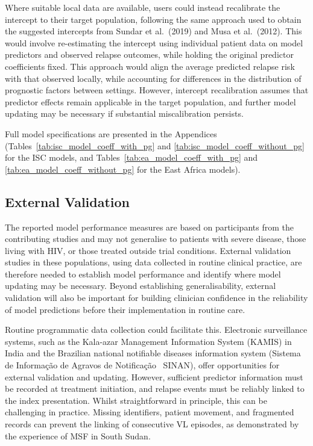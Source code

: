 \begin{mccorrection}
  Where suitable local data are available, users could instead recalibrate the intercept to their target population, following the same approach used to obtain the suggested intercepts from Sundar et al.\ (2019) and Musa et al.\ (2012)\cite{sundar2019,musa2012}. This would involve re-estimating the intercept using individual patient data on model predictors and observed relapse outcomes, while holding the original predictor coefficients fixed\cite{riley2024A}. This approach would align the average predicted relapse risk with that observed locally, while accounting for differences in the distribution of prognostic factors between settings. However, intercept recalibration assumes that predictor effects remain applicable in the target population, and further model updating may be necessary if substantial miscalibration persists.
\end{mccorrection}

Full model specifications are presented in the Appendices (Tables~\ref{tab:isc_model_coeff_with_pg} and \ref{tab:isc_model_coeff_without_pg} for the ISC models, and Tables~\ref{tab:ea_model_coeff_with_pg} and \ref{tab:ea_model_coeff_without_pg} for the East Africa models).

\subsection{External Validation}

The reported model performance measures are based on participants from the contributing studies and may not generalise to patients with severe disease, those living with HIV, or those treated outside trial conditions. External validation studies in these populations, using data collected in routine clinical practice, are therefore needed to establish model performance and identify where model updating may be necessary\cite{riley2024A}. Beyond establishing generalisability, external validation will also be important for building clinician confidence in the reliability of model predictions before their implementation in routine care.

Routine programmatic data collection could facilitate this. Electronic surveillance systems, such as the Kala-azar Management Information System (KAMIS) in India\cite{bindroo2021} and the Brazilian national notifiable diseases information system (Sistema de Informação de Agravos de Notificação \textemdash\ SINAN)\cite{assefa2026}, offer opportunities for external validation and updating. However, sufficient predictor information must be recorded at treatment initiation, and relapse events must be reliably linked to the index presentation. Whilst straightforward in principle, this can be challenging in practice. Missing identifiers, patient movement, and fragmented records can prevent the linking of consecutive VL episodes, as demonstrated by the experience of MSF in South Sudan\cite{naylor-leyland2022}.


